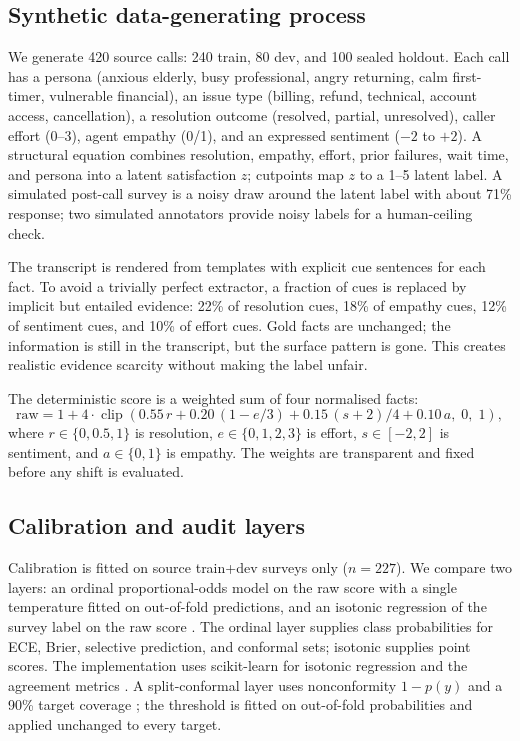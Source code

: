 \documentclass[11pt,a4paper]{article}
\begin{document}
\subsection{Synthetic data-generating process}

We generate 420 source calls: 240 train, 80 dev, and 100 sealed holdout. Each call has a persona
(anxious elderly, busy professional, angry returning, calm first-timer, vulnerable financial),
an issue type (billing, refund, technical, account access, cancellation), a resolution outcome
(resolved, partial, unresolved), caller effort (0--3), agent empathy (0/1), and an expressed
sentiment ($-2$ to $+2$). A structural equation combines resolution, empathy, effort, prior
failures, wait time, and persona into a latent satisfaction $z$; cutpoints map $z$ to a 1--5
latent label. A simulated post-call survey is a noisy draw around the latent label with about
71\% response; two simulated annotators provide noisy labels for a human-ceiling check.

The transcript is rendered from templates with explicit cue sentences for each fact. To avoid a
trivially perfect extractor, a fraction of cues is replaced by implicit but entailed evidence:
22\% of resolution cues, 18\% of empathy cues, 12\% of sentiment cues, and 10\% of effort cues.
Gold facts are unchanged; the information is still in the transcript, but the surface pattern is
gone. This creates realistic evidence scarcity without making the label unfair.

The deterministic score is a weighted sum of four normalised facts:
\begin{equation}
\mathrm{raw} = 1 + 4\cdot \operatorname{clip}\!\left(
0.55\,r + 0.20\,(1-e/3) + 0.15\,(s+2)/4 + 0.10\,a,\;0,\;1
\right),
\label{eq:score}
\end{equation}
where $r\in\{0,0.5,1\}$ is resolution, $e\in\{0,1,2,3\}$ is effort, $s\in[-2,2]$ is sentiment,
and $a\in\{0,1\}$ is empathy. The weights are transparent and fixed before any shift is
evaluated.

\subsection{Calibration and audit layers}

Calibration is fitted on source train+dev surveys only ($n=227$). We compare two layers: an
ordinal proportional-odds model on the raw score with a single temperature fitted on out-of-fold
predictions, and an isotonic regression of the survey label on the raw score
\citep{niculescu2005predicting}. The ordinal layer supplies class probabilities for ECE, Brier,
selective prediction, and conformal sets; isotonic supplies point scores. The implementation
uses scikit-learn for isotonic regression and the agreement metrics \citep{pedregosa2011scikit}. A split-conformal
layer uses nonconformity $1-p(y)$ and a 90\% target coverage \citep{angelopoulos2021gentle}; the
threshold is fitted on out-of-fold probabilities and applied unchanged to every target.
\end{document}
